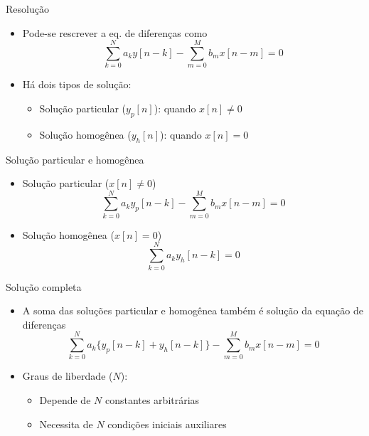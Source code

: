 \documentclass[
size=17pt,
paper=smartboard,
mode=present,
display=slidesnotes,
style=sailor,
nopagebreaks,
blackslide,
fleqn]{powerdot}
\begin{document}
\begin{slide}[toc=]{Resolução}
   \begin{itemize}
      \item Pode-se rescrever a eq. de diferenças como
      \begin{equation*}
         \sum_{ k = 0 }^{ N } a_k y[ n - k ]-\sum_{ m = 0 }^{ M } b_m x[ n - m ]=0
      \end{equation*}\pause
      \item Há dois tipos de solução:
      \begin{itemize}
         \item Solução particular ($y_p[n]$): quando $x[n]\neq 0$
         \item Solução homogênea ($y_h[n]$): quando $x[n]= 0$
      \end{itemize}
   \end{itemize}
\end{slide}

\begin{slide}[toc=]{Solução particular e homogênea}
   \begin{itemize}
      \item Solução particular ($x[n]\neq 0$)
      \begin{equation*}
         \sum_{ k = 0 }^{ N } a_k y_p[ n - k ]-\sum_{ m = 0 }^{ M } b_m x[ n - m ]=0
      \end{equation*}\pause
      \item Solução homogênea ($x[n]=0$)
      \begin{equation*}
         \sum_{ k = 0 }^{ N } a_k y_h[ n - k ]=0
      \end{equation*}
   \end{itemize}
\end{slide}

\begin{slide}[toc=]{Solução completa}
   \begin{itemize}
      \item A soma das soluções particular e homogênea também é solução da equação de diferenças
      \begin{equation*}
         \sum_{ k = 0 }^{ N } a_k \{y_p[ n - k ]+y_h[ n - k ]\}-\sum_{ m = 0 }^{ M } b_m x[ n - m]=0
      \end{equation*}\pause
      \item Graus de liberdade ($N$): 
      \begin{itemize}
         \item Depende de $N$ constantes arbitrárias
         \item Necessita de $N$ condições iniciais auxiliares
      \end{itemize}
   \end{itemize}
\end{slide}
\end{document}
